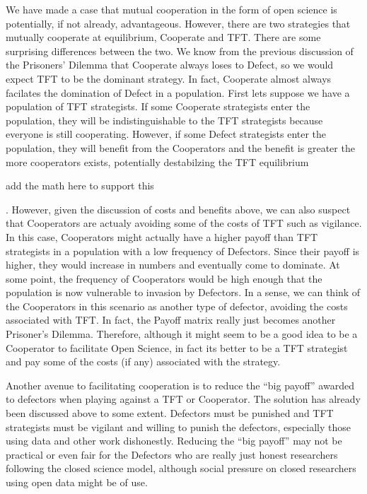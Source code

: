 \documentclass[11pt]{article} %
\begin{document}
We have made a case that mutual cooperation in the form of open science is potentially, if not already, advantageous. However, there are two strategies that mutually cooperate at equilibrium, Cooperate and TFT. There are some surprising differences between the two. We know from the previous discussion of the Prisoners' Dilemma that Cooperate always loses to Defect, so we would expect TFT to be the dominant strategy. In fact, Cooperate almost always facilates the domination of Defect in a population.  First lets suppose we have a population of TFT strategists. If some Cooperate strategists enter the population, they will be indistinguishable to the TFT strategists because everyone is still cooperating. However, if some Defect strategists enter the population, they will benefit from the Cooperators and the benefit is greater the more cooperators exists, potentially destabilzing the TFT equilibrium \begin{em} add the math here to support this \end{em}. However, given the discussion of costs and benefits above, we can also suspect that Cooperators are actualy avoiding some of the costs of TFT such as vigilance. In this case, Cooperators might actually have a higher payoff than TFT strategists in a population with a low frequency of Defectors. Since their payoff is higher, they would increase in numbers and eventually come to dominate. At some point, the frequency of Cooperators would be high enough that the population is now vulnerable to invasion by Defectors. In a sense, we can think of the Cooperators in this scenario as another type of defector, avoiding the costs associated with TFT. In fact, the Payoff matrix really just becomes another Prisoner's Dilemma. Therefore, although it might seem to be a good idea to be a Cooperator to facilitate Open Science, in fact its better to be a TFT strategist and pay some of the costs (if any) associated with the strategy.

Another avenue to facilitating cooperation is to reduce the ``big payoff'' awarded to defectors when playing against a TFT or Cooperator. The solution has already been discussed above to some extent. Defectors must be punished and TFT strategists must be vigilant and willing to punish the defectors, especially those using data and other work dishonestly. Reducing the ``big payoff'' may not be practical or even fair for the Defectors who are really just honest researchers following the closed science model, although social pressure on closed researchers using open data might be of use.
\end{document}
